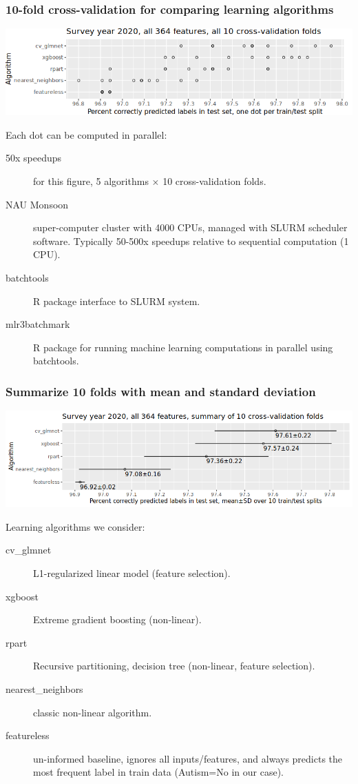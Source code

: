 \documentclass{beamer}
\begin{document}
\begin{frame}
  \frametitle{10-fold cross-validation for comparing learning algorithms}
  \includegraphics[width=\textwidth]{download-nsch-mlr3batchmark-registry-one-set-all-features.png}

Each dot can be computed in parallel:
\begin{description}
\item[50x speedups] for this figure, 5 algorithms $\times$
  10 cross-validation folds.
\item[NAU Monsoon] super-computer cluster with 4000 CPUs, managed with
  SLURM scheduler software. Typically 50-500x speedups relative to
  sequential computation (1 CPU).
\item[batchtools] R package interface to SLURM system.
\item[mlr3batchmark] R package for running machine learning
  computations in parallel using batchtools.
\end{description}

\end{frame}

\begin{frame}
  \frametitle{Summarize 10 folds with mean and standard deviation}
  \includegraphics[width=\textwidth]{download-nsch-mlr3batchmark-registry-one-set-all-features-stats.png}

Learning algorithms we consider:
\begin{description}
\item[cv\_glmnet] L1-regularized linear model (feature selection).
\item[xgboost] Extreme gradient boosting (non-linear).
\item[rpart] Recursive partitioning, decision tree (non-linear, feature selection).
\item[nearest\_neighbors] classic non-linear algorithm.
\item[featureless] un-informed baseline, ignores all inputs/features,
  and always predicts the most frequent label in train data (Autism=No
  in our case).
\end{description}

\end{frame}
\end{document}
